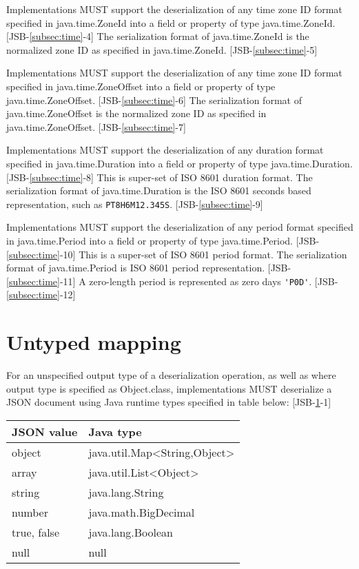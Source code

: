Implementations MUST support the deserialization of any time zone ID format specified in java.time.ZoneId into a field or property of type java.time.ZoneId. [JSB-\ref{subsec:time}-4]
The serialization format of java.time.ZoneId is the normalized zone ID as specified in java.time.ZoneId. [JSB-\ref{subsec:time}-5]

Implementations MUST support the deserialization of any time zone ID format specified in java.time.ZoneOffset into a field or property of type java.time.ZoneOffset. [JSB-\ref{subsec:time}-6]
The serialization format of java.time.ZoneOffset is the normalized zone ID as specified in java.time.ZoneOffset. [JSB-\ref{subsec:time}-7]

Implementations MUST support the deserialization of any duration format specified in java.time.Duration into a field or property of type java.time.Duration. [JSB-\ref{subsec:time}-8] This is super-set of ISO 8601 duration format.
The serialization format of java.time.Duration is the ISO 8601 seconds based representation, such as
\verb|PT8H6M12.345S|. [JSB-\ref{subsec:time}-9]

Implementations MUST support the deserialization of any period format specified in java.time.Period into a field or property of type java.time.Period. [JSB-\ref{subsec:time}-10] 
This is a super-set of ISO 8601 period format.
The serialization format of java.time.Period is ISO 8601 period representation. [JSB-\ref{subsec:time}-11] 
A zero-length period is represented as zero days \verb|'P0D'|. [JSB-\ref{subsec:time}-12]


\section{Untyped mapping}
\label{sec:untyped}
For an unspecified output type of a deserialization operation, as well as where output type is specified as Object.class, implementations MUST deserialize a JSON document using Java runtime types specified in table below: [JSB-\ref{sec:untyped}-1]

\begin{tabularx}{\textwidth}{ |X|X| }
\hline
JSON value & Java type \\ 
\hline
object & java.util.Map\textless String,Object\textgreater\\
array & java.util.List\textless Object\textgreater \\
string & java.lang.String \\
number & java.math.BigDecimal \\
true, false & java.lang.Boolean \\
null & null \\
\hline
\end{tabularx}

